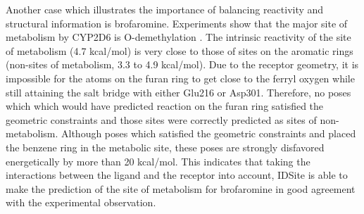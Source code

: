 Another case which illustrates the importance of balancing reactivity and structural information is brofaromine.
Experiments show that the major site of metabolism by CYP2D6 is O-demethylation \cite{feifel1993role}.
The intrinsic reactivity of the site of metabolism (4.7 kcal/mol) is very close to those of sites on the aromatic rings (non-sites of metabolism, 3.3 to 4.9 kcal/mol).
Due to the receptor geometry, it is impossible for the atoms on the furan ring to get close to the ferryl oxygen while still attaining the salt bridge with either Glu216 or Asp301.
Therefore, no poses which which would have predicted reaction on the furan ring satisfied the geometric constraints and those sites were correctly predicted as sites of non-metabolism. 
Although poses which satisfied the geometric constraints and placed the benzene ring in the metabolic site, these poses are strongly disfavored energetically by more than 20 kcal/mol. 
This indicates that taking the interactions between the ligand and the receptor into account, IDSite is able to make the prediction of the site of metabolism for brofaromine in good agreement with the experimental observation.

